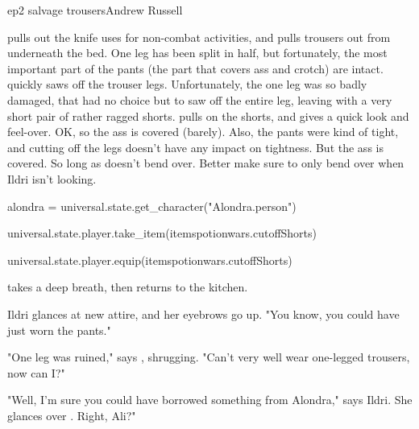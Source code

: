 \documentclass{book}
\begin{document}
\begin{childnode}{ep2 salvage trousers}{Andrew Russell}

    \name{} pulls out the knife \heshe{} uses for non-combat activities, and pulls \hisher{} trousers out from underneath the bed. One leg has been split in half, but fortunately, the most important
    part of the pants (the part that covers \hisher{} ass and crotch) are intact.
    \name{} quickly saws off the trouser legs. Unfortunately, the one leg was so badly damaged, that \heshe{} had no choice but to saw off the entire leg, leaving \himher{} with a very short pair 
    of rather ragged shorts. \HeShe{} pulls on the shorts, and gives \himselfherself{} a quick look and feel-over. OK, so the ass is covered (barely). Also, the pants were kind of tight, and cutting
    off the legs doesn't have any impact on tightness. But the ass is covered. So long as \heshe{} doesn't
    bend over. Better make sure to only bend over when Ildri isn't looking.

    \begin{code}

        alondra = universal.state.get\_character("Alondra.person")

        universal.state.player.take\_item(itemspotionwars.cutoffShorts)

        universal.state.player.equip(itemspotionwars.cutoffShorts)

    \end{code}

    \name{} takes a deep breath, then returns to the kitchen. 
    
    Ildri glances at \names{} new attire, and her eyebrows go up. "You know, you could have just worn the pants."

    "One leg was ruined," says \name{}, shrugging. "Can't very well wear one-legged trousers, now can I?"

    "Well, I'm sure you could have borrowed something from Alondra," says Ildri. She glances over \name{}. 
    Right, Ali?"


\end{childnode}
\end{document}
